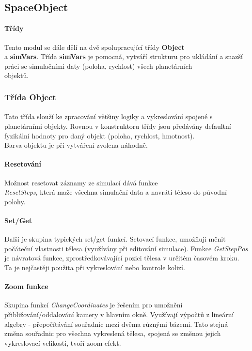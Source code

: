 \documentclass[a4paper, 12pt]{article}
\begin{document}
\subsection{SpaceObject}
\paragraph{Třídy}
Tento modul se dále dělí na dvě spolupracující třídy \textbf{Object}\\ a
\textbf{simVars}. Třída \textbf{simVars} je pomocná, vytváří strukturu pro
ukládání a snazší práci se simulačními daty (poloha, rychlost) všech
planetárních \\objektů.

\subsubsection{Třída Object}
\paragraph{}
Tato třída slouží ke zpracování většiny logiky a vykreslování spojené s
planetárními objekty. Rovnou v konstruktoru třídy jsou předávány defaultní
fyzikální hodnoty pro daný objekt (poloha, rychlost, hmotnost). \\Barva objektu
je při vytváření zvolena náhodně.  

\paragraph{Resetování}
Možnost resetovat záznamy ze simulací dává funkce \\\emph{ResetSteps}, která maže
všechna simulační data a navrátí těleso do původní polohy. 

\paragraph{Set/Get}
Další je skupina typických set/get funkcí. Setovací funkce, umožňují
měnit počáteční vlastnosti tělesa (využívány při editování simulace). Funkce
\emph{GetStepPos} je návratová funkce, zprostředkovávající pozici tělesa v
určitém časovém kroku. Ta je nejčastěji použita při vykreslování nebo kontrole
kolizí.

\paragraph{Zoom funkce}
Skupina funkcí \emph{ChangeCoordinates} je řešením pro umožnění
\\přibližování/oddalování kamery v hlavním okně. Využívají výpočtů z lineární
algebry - přepočítávání souřadnic mezi dvěma různými bázemi. Tato stejná změna
souřadnic pro všechna vykreslená tělesa, spojená se změnou jejich vykreslovací
velikosti, tvoří zoom efekt.
\end{document}
